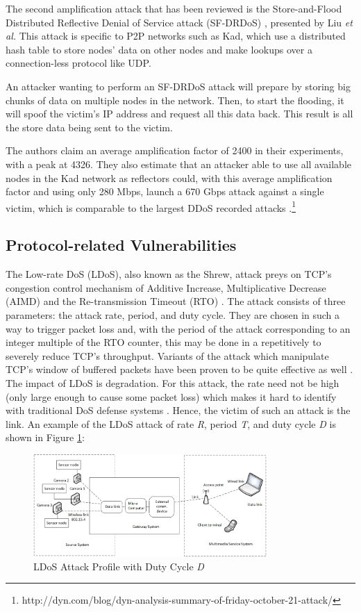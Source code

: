\documentclass[conference]{IEEEtran}
\begin{document}
The second amplification attack that has been reviewed is the Store-and-Flood Distributed Reflective Denial of Service attack (SF-DRDoS) \cite{Liu:SFDRDoS}, presented by Liu \textit{et al.} This attack is specific to P2P networks such as Kad, which use a distributed hash table to store nodes' data on other nodes and make lookups over a connection-less protocol like UDP.

An attacker wanting to perform an SF-DRDoS attack will prepare by storing big chunks of data on multiple nodes in the network. Then, to start the flooding, it will spoof the victim's IP address and request all this data back. This result is all the store data being sent to the victim.

The authors claim an average amplification factor of 2400 in their experiments, with a peak at 4326. They also estimate that an attacker able to use all available nodes in the Kad network as reflectors could, with this average amplification factor and using only 280 Mbps, launch a 670 Gbps attack against a single victim, which is comparable to the largest DDoS recorded attacks \cite{Arbor:WISR}.\footnote{http://dyn.com/blog/dyn-analysis-summary-of-friday-october-21-attack/}

\subsection{Protocol-related Vulnerabilities}
The Low-rate DoS (LDoS), also known as the Shrew, attack preys on TCP's congestion control mechanism of Additive Increase, Multiplicative Decrease (AIMD) and the Re-transmission Timeout (RTO) \cite{Li:LAAEM}. The attack consists of three parameters: the attack rate, period, and duty cycle. They are chosen in such a way to trigger packet loss and, with the period of the attack corresponding to an integer multiple of the RTO counter, this may be done in a repetitively to severely reduce TCP's throughput. Variants of the attack which manipulate TCP's window of buffered packets have been proven to be quite effective as well \cite{Yue:shrew}. The impact of LDoS is degradation. For this attack, the rate need not be high (only large enough to cause some packet loss) which makes it hard to identify with traditional DoS defense systems \cite{Li:LAAEM}. Hence, the victim of such an attack is the link. An example of the LDoS attack of rate \textit{R}, period \textit{T}, and duty cycle \textit{D} is shown in Figure \ref{fig_ldosAttProf}:

\begin{figure}[!ht]
\centering
\includegraphics[width=3.5in]{traffic}
\caption{LDoS Attack Profile with Duty Cycle \textit{D}}
\label{fig_ldosAttProf}
\end{figure}
\end{document}
